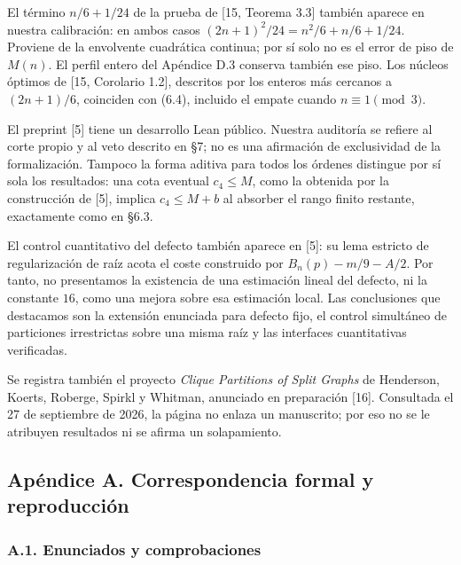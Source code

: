 \documentclass[spanish,11pt,a4paper]{article}
\begin{document}
El término \(n/6+1/24\) de la prueba de {[}15, Teorema 3.3{]} también aparece en nuestra calibración: en ambos casos \((2n+1)^2/24=n^2/6+n/6+1/24\). Proviene de la envolvente cuadrática continua; por sí solo no es el error de piso de \(M(n)\). El perfil entero del Apéndice D.3 conserva también ese piso. Los núcleos óptimos de {[}15, Corolario 1.2{]}, descritos por los enteros más cercanos a \((2n+1)/6\), coinciden con (6.4), incluido el empate cuando \(n\equiv1\pmod3\).

El preprint {[}5{]} tiene un desarrollo Lean público. Nuestra auditoría se refiere al corte propio y al veto descrito en §7; no es una afirmación de exclusividad de la formalización. Tampoco la forma aditiva para todos los órdenes distingue por sí sola los resultados: una cota eventual \(c_4\le M\), como la obtenida por la construcción de {[}5{]}, implica \(c_4\le M+b\) al absorber el rango finito restante, exactamente como en §6.3.

El control cuantitativo del defecto también aparece en {[}5{]}: su lema estricto de regularización de raíz acota el coste construido por \(B_n(p)-m/9-A/2\). Por tanto, no presentamos la existencia de una estimación lineal del defecto, ni la constante \(16\), como una mejora sobre esa estimación local. Las conclusiones que destacamos son la extensión enunciada para defecto fijo, el control simultáneo de particiones irrestrictas sobre una misma raíz y las interfaces cuantitativas verificadas.

Se registra también el proyecto \emph{Clique Partitions of Split Graphs} de Henderson, Koerts, Roberge, Spirkl y Whitman, anunciado en preparación {[}16{]}. Consultada el 27 de septiembre de 2026, la página no enlaza un manuscrito; por eso no se le atribuyen resultados ni se afirma un solapamiento.

\subsection{Apéndice A. Correspondencia formal y reproducción}\label{apendice-a.-correspondencia-formal-y-reproduccion}

\subsubsection{A.1. Enunciados y comprobaciones}\label{a.1.-enunciados-y-comprobaciones}
\end{document}
